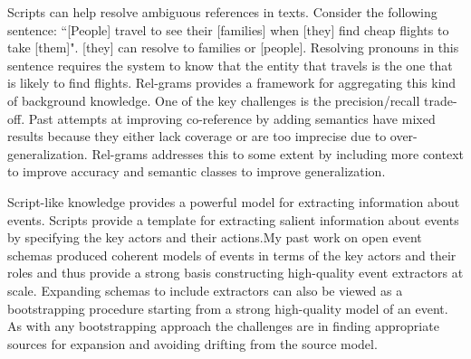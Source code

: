 \documentclass[a4paper,11pt,onecolumn]{article}
\newcommand{\eat}[1]{}
\begin{document}

Scripts can help resolve ambiguous references in texts. Consider the following sentence: ``[People] travel to see their [families] when [they] find cheap flights to take [them]". [they] can resolve to families or [people]. Resolving pronouns in this sentence requires the system to know that the entity that travels is the one that is likely to find flights. Rel-grams provides a framework for aggregating this kind of background knowledge. One of the key challenges is the precision/recall trade-off. Past attempts at improving co-reference by adding semantics have mixed results because they either lack coverage or are too imprecise due to over-generalization. Rel-grams addresses this to some extent by including more context to improve accuracy and semantic classes to improve generalization. 

Script-like knowledge provides a powerful model for extracting information about events. Scripts provide a template for extracting salient information about events by specifying the key actors and their actions.My past work on open event schemas produced coherent models of events in terms of the key actors and their roles and thus provide a strong basis constructing high-quality event extractors at scale. Expanding schemas to include extractors can also be viewed as a bootstrapping procedure starting from a strong high-quality model of an event. As with any bootstrapping approach the challenges are in finding appropriate sources for expansion and avoiding drifting from the source model. 


\eat{They are a powerful model of events including key actors, their roles and causal relationships~\cite{schank-scripts75}. Event schemas provide a start for building these script-like knowledge about events. However, they have limited generalization due to the use of a relatively smaller set of semantic classes. For example, the schemas cannot distinguish between a sports person and a baseball player. Moreover, the schemas do not include causality relations or temporal ordering of the actions within the schema. For example, the arrest schema does not  include information about whether the arrest precedes filing charges or vice versa. First, I wish to exploit high-quality entity linking systems and semantic resources such as NELL to expand to a much larger hierarchy of semantic classes. This raises interesting challenges: It is difficult to decide what semantic class to assign to a specific relation. In some cases a general category is preferable (e.g., ([sportsperson], failed, [drug test]) ), whereas in others a more specific category is preferable (e.g., ([baseball player], scored, home run)).  Second, I wish to leverage causality detection methods to annotate the schemas with causal relations. Even though these methods are not perfect, we can devise techniques that can prune errors in aggregation. }
\end{document}
